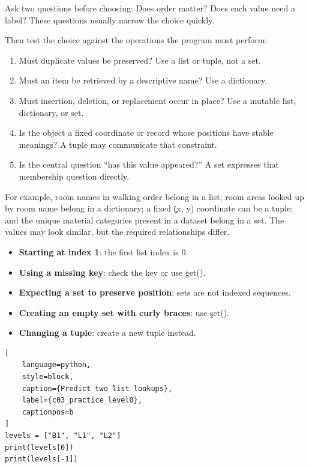 Ask two questions before choosing: Does order matter? Does each value need a
label? These questions usually narrow the choice quickly.

Then test the choice against the operations the program must perform:
\begin{enumerate}
    \item Must duplicate values be preserved? Use a list or tuple, not a set.
    \item Must an item be retrieved by a descriptive name? Use a dictionary.
    \item Must insertion, deletion, or replacement occur in place? Use a
          mutable list, dictionary, or set.
    \item Is the object a fixed coordinate or record whose positions have
          stable meanings? A tuple may communicate that constraint.
    \item Is the central question ``has this value appeared?'' A set expresses
          that membership question directly.
\end{enumerate}

For example, room names in walking order belong in a list; room areas looked
up by room name belong in a dictionary; a fixed \c{(x, y)} coordinate can be a
tuple; and the unique material categories present in a dataset belong in a
set. The values may look similar, but the required relationships differ.


\begin{itemize}
    \item \textbf{Starting at index 1}: the first list index is 0.
    \item \textbf{Using a missing key}: check the key or use \c{get()}.
    \item \textbf{Expecting a set to preserve position}: sets are not indexed sequences.
    \item \textbf{Creating an empty set with curly braces}: use \c{set()}.
    \item \textbf{Changing a tuple}: create a new tuple instead.
\end{itemize}



\begin{lstlisting}[
    language=python,
    style=block,
    caption={Predict two list lookups},
    label={c03_practice_level0},
    captionpos=b
]
levels = ["B1", "L1", "L2"]
print(levels[0])
print(levels[-1])
\end{lstlisting}


